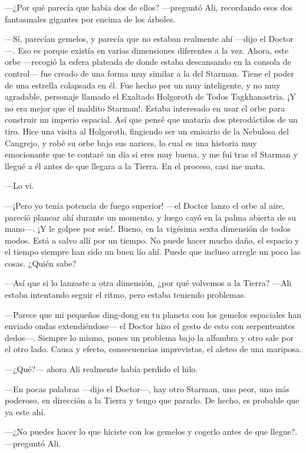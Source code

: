 ---¿Por qué parecía que había dos de ellos? ---preguntó Ali, recordando
esos dos fantasmales gigantes por encima de los árboles.

---Sí, parecían gemelos, y parecía que no estaban realmente ahí ---dijo
el Doctor---. Eso es porque existía en varias dimensiones diferentes a
la vez. Ahora, este orbe ---recogió la esfera plateada de donde estaba
descansando en la consola de control--- fue creado de una forma muy
similar a la del Starman. Tiene el poder de una estrella colapsada en
él. Fue hecho por un muy inteligente, y no muy agradable, personaje
llamado el Exaltado Holgoroth de Todos Tagkhanastria. ¡Y no era mejor
que el maldito Starman!. Estaba interesado en usar el orbe para
construir un imperio espacial. Así que pensé que mataría dos
pterodáctilos de un tiro. Hice una visita al Holgoroth, fingiendo ser un
emisario de la Nebulosa del Cangrejo, y robé su orbe bajo sus narices,
lo cual es una historia muy emocionante que te contaré un día si eres
muy buena, y me fui tras el Starman y llegué a él antes de que llegara a
la Tierra. En el proceso, casi me mata.

---Lo vi.

---¡Pero yo tenía potencia de fuego superior! ---el Doctor lanzo el orbe
al aire, parecíó planear ahí durante un momento, y luego cayó en la
palma abierta de su mano---. ¡Y le golpee por seis!. Bueno, en la
vigésima sexta dimensión de todos modos. Está a salvo allí por un
tiempo. No puede hacer mucho daño, el espacio y el tiempo siempre han
sido un buen lío ahí. Puede que incluso arregle un poco las cosas.
¿Quién sabe?

---Así que si lo lanzaste a otra dimensión, ¿por qué volvemos a la
Tierra? ---Ali estaba intentando seguir el ritmo, pero estaba teniendo
problemas.

---Parece que mi pequeños ding-dong en tu planeta con los gemelos
espaciales han enviado ondas extendiéndose--- el Doctor hizo el gesto de
esto con serpenteantes dedos---. Siempre lo mismo, pones un problema
bajo la alfombra y otro sale por el otro lado. Causa y efecto,
consecuencias imprevistas, el aleteo de una mariposa.

---¿Qué?--- ahora Ali realmente había perdido el hilo.

---En pocas palabras ---dijo el Doctor---, hay otro Starman, uno peor,
uno más poderoso, en dirección a la Tierra y tengo que pararlo. De
hecho, es probable que ya este ahí.

---¿No puedes hacer lo que hiciste con los gemelos y cogerlo antes de
que llegue?. ---preguntó Ali.

